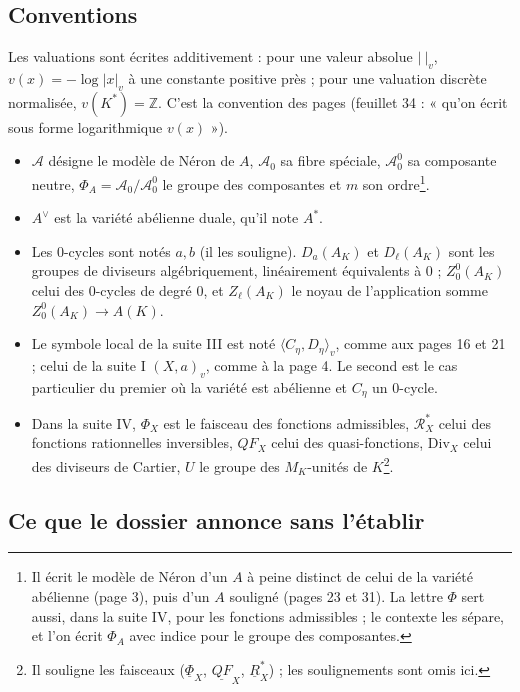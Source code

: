 \documentclass[11pt,a4paper]{article}
\begin{document}
\subsection*{Conventions}

Les valuations sont écrites additivement : pour une valeur absolue
$|\ |_v$, $v(x) = -\log|x|_v$ à une constante positive près ; pour une
valuation discrète normalisée, $v(K^*) = \mathbb{Z}$. C'est la convention
des pages (feuillet 34 : « qu'on écrit sous forme logarithmique $v(x)$ »).

\begin{itemize}
  \item $\mathcal{A}$ désigne le modèle de Néron de $A$, $\mathcal{A}_0$
  sa fibre spéciale, $\mathcal{A}_0^0$ sa composante neutre,
  $\Phi_A = \mathcal{A}_0/\mathcal{A}_0^0$ le groupe des composantes et
  $m$ son ordre\footnote{Il écrit le modèle de Néron d'un $A$ à peine
  distinct de celui de la variété abélienne (page 3), puis d'un $A$ souligné
  (pages 23 et 31). La lettre $\Phi$ sert aussi, dans la suite IV, pour les
  fonctions admissibles ; le contexte les sépare, et l'on écrit $\Phi_A$
  avec indice pour le groupe des composantes.}.
  \item $A^\vee$ est la variété abélienne duale, qu'il note $A^*$.
  \item Les $0$-cycles sont notés $a, b$ (il les souligne). $D_a(A_K)$ et
  $D_\ell(A_K)$ sont les groupes de diviseurs algébriquement,
  linéairement équivalents à $0$ ; $Z_0^0(A_K)$ celui des $0$-cycles de
  degré $0$, et $Z_\ell(A_K)$ le noyau de l'application somme
  $Z_0^0(A_K) \to A(K)$.
  \item Le symbole local de la suite III est noté
  $\langle C_\eta, D_\eta\rangle_v$, comme aux pages 16 et 21 ; celui de la
  suite I $(X, a)_v$, comme à la page 4. Le second est le cas particulier
  du premier où la variété est abélienne et $C_\eta$ un $0$-cycle.
  \item Dans la suite IV, $\Phi_X$ est le faisceau des fonctions
  admissibles, $\mathcal{R}^*_X$ celui des fonctions rationnelles
  inversibles, $QF_X$ celui des quasi-fonctions, $\mathrm{Div}_X$ celui des
  diviseurs de Cartier, $U$ le groupe des $M_K$-unités de $K$\footnote{Il
  souligne les faisceaux ($\underline{\Phi}_X$, $\underline{QF}_X$,
  $\underline{R}^*_X$) ; les soulignements sont omis ici.}.
\end{itemize}

\subsection*{Ce que le dossier annonce sans l'établir}
\end{document}
